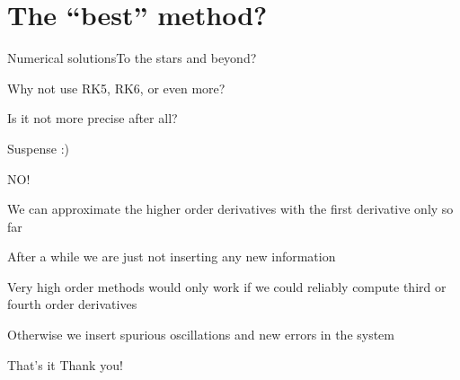 \documentclass{beamer}
\begin{document}
\section{The ``best'' method?}
\begin{slide}{Numerical solutions}{To the stars and beyond?}{
\item Why not use RK5, RK6, or even more?
\item Is it not more precise after all?
\pause
\item Suspense :)
\pause
\item NO!
\item We can approximate the higher order derivatives with the first derivative only so far
\item After a while we are just not inserting any new information
\item Very high order methods would only work if we could reliably compute third or fourth order derivatives
\item Otherwise we insert spurious oscillations and new errors in the system
}\end{slide}

\begin{frame}{That's it}
\center
\fontsize{18pt}{7.2}\selectfont
Thank you!
\end{frame}
\end{document}
